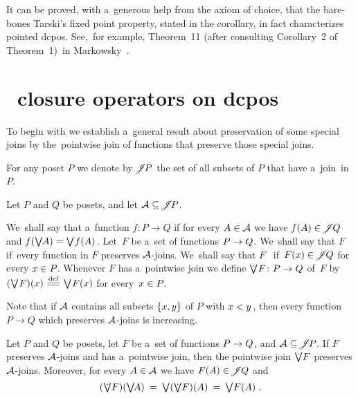 \documentclass[11pt,letterpaper]{article}
\renewcommand{\thmskip}{\bigskip}
\begin{document}
\pagebreak[3]
\thmskip

It can be proved, with a~generous help from the axiom of choice,
that the bare-bones Tarski's fixed point property, stated in the corollary,
	in fact characterizes pointed dcpos.
See,~for example, Theorem~11 (after consulting Corollary~2 of Theorem~1)~in Markowsky~\cite{markowsky}.


\section{\Scottcont\ closure operators on dcpos}
\label{sec:Scottcont-clopers-on-dcpo}

To begin with we establish a~general result
about preservation of some special joins
	by the~pointwise join of functions that preserve those special joins.

\txtskip

For any poset $P$ we denote by $\Joinable\negtinysp P$
	the set of all subsets of $P$ that have a~join~in~$P$.

Let $P$ and $Q$ be posets, and let $\coll{A}\subseteq\Joinable\negtinysp P$.

We~shall say that a~function $f\colon P\to Q$ 
    if for every $A\in\mathcal{A}$ we have
	$f(A)\in\!\mathscr{J}\mspace{-2mu} Q$ and $f(\mathop{\textstyle\bigvee}\nolimits\mspace{-1mu}\!A)=\mathop{\textstyle\bigvee}\nolimits\mspace{-2mu} f(A)\mspace{1mu}$.
Let~$F$ be a~set of functions $P\to Q\mspace{1mu}$.
We~shall say that $F$~
	if~every function in $F$ preserves $\mathcal{A}$-joins.
We~shall say that $F$~
	if~$F(x)\in\!\mathscr{J}\mspace{-2mu} Q$ for every $x\in P\mspace{-1mu}$.
Whenever $F$ has a~pointwise join
	we define  $\dottJoin\negdtinysp F\colon P\to Q$ of~$F$
by $(\dottJoin\negdtinysp F)(x) \defeq \tJoin\negdtinysp F(x)$ for every~$x\in P\mspace{-1mu}$.

Note that if $\mathcal{A}$ contains all subsets $\{ x,y \}$ of $P$ with $x<y\mspace{1mu}$,
then every function $P\to Q$ which preserves $\mathcal{A}$-joins is increasing.

\thmskip

\begin{lemma}\label{lem:preserv-of-joins-by-pntwise-join}
Let\/ $P$ and\/ $Q$ be posets, let\/ $F$ be a~set of functions\/ $P\to Q\mspace{1mu}$,
	and\/ $\coll{A}\subseteq\Joinable\negtinysp P\negtinysp$.
If\/ $F$ preserves $\mathcal{A}$-joins and has a~pointwise join,
then the pointwise join\/ $\dottJoin\!F$ preserves $\mathcal{A}$-joins.
More\-over, for every\/ $A\in\mathcal{A}$ we have\/ $F(A)\in\!\mathscr{J}\mspace{-2mu} Q$ and
%
\begin{equation}\label{eq:(pwJoin F)(Join A)=Join(pwJoin f)(A)=Join F(A)}
    (\dottJoin\!F)(\tJoin\negdtinysp\!A)
	\Eq \tJoin(\dottJoin\!F)(A)
	\Eq \tJoin\!F(A)~.
\end{equation}
%
\end{lemma}
\end{document}
